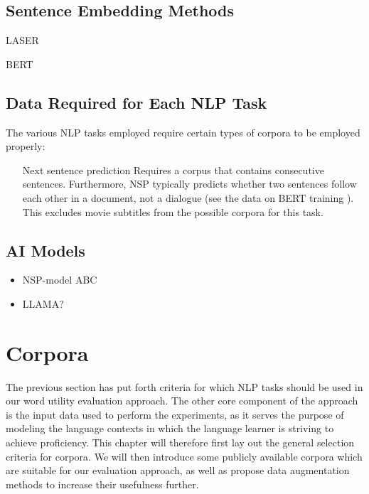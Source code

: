 \subsection{Sentence Embedding Methods}

\begin{description}
	\item[LASER] \cite{artetxeMassivelyMultilingualSentence2019}
	\item[BERT] \cite{reimersMakingMonolingualSentence2020}
\end{description}

\subsection{Data Required for Each NLP Task}
The various NLP tasks employed require certain types of corpora to be employed properly:

\begin{itemize}
	\item[Next sentence prediction]
	      Requires a corpus that contains consecutive sentences.
	      Furthermore, NSP typically predicts whether two sentences follow each other in a document, not a dialogue (see the data on BERT training \cite{kentonBertPretrainingDeep2019}).
	      This excludes movie subtitles from the possible corpora for this task.

\end{itemize}

\subsection{AI Models}
\begin{itemize}
	\item NSP-model ABC
	\item LLAMA?
\end{itemize}



\section{Corpora}
The previous section has put forth criteria for which NLP tasks should be used in our word utility evaluation approach.
The other core component of the approach is the input data used to perform the experiments, as it serves the purpose of modeling the language contexts in which the language learner is striving to achieve proficiency.
This chapter will therefore first lay out the general selection criteria for corpora.
We will then introduce some publicly available corpora which are suitable for our evaluation approach, as well as propose data augmentation methods to increase their usefulness further.



